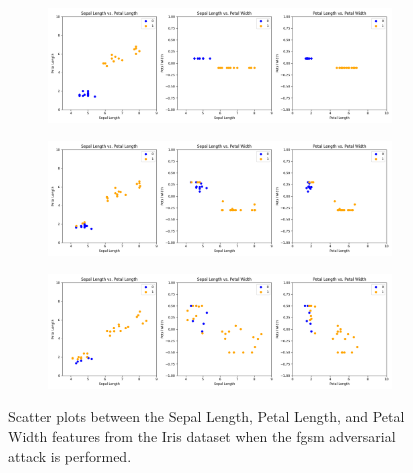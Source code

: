 \begin{figure}[!h]
  \centering

  \begin{subfigure}{\textwidth}
      \includegraphics[width=\linewidth]{figures/adversarial_analysis/adversarial-pgd-0.1.png}
      \label{fig:adv6}
  \end{subfigure}

  \begin{subfigure}{\textwidth}
    \includegraphics[width=\linewidth]{figures/adversarial_analysis/adversarial-pgd-0.3.png}
    \label{fig:adv7}
  \end{subfigure}

  \begin{subfigure}{\textwidth}
    \includegraphics[width=\linewidth]{figures/adversarial_analysis/adversarial-pgd-0.5.png}
    \label{fig:adv8}
  \end{subfigure}

  \caption{Scatter plots between the Sepal Length, Petal Length, and Petal Width features from the Iris dataset when the \ac{fgsm} adversarial attack is performed.}
  \label{fig:adv-pgd}
\end{figure} \

